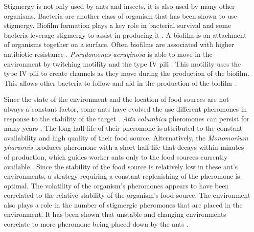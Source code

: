 Stigmergy is not only used by ants and insects, it is also used by many other organisms.
Bacteria are another class of organism that has been shown to use stigmergy.
Biofilm formation plays a key role in bacterial survival and some bacteria leverage stigmergy to assist in producing it \cite{gloag_bacterial_2015}.
A biofilm is an attachment of organisms together on a surface.
Often biofilms are associated with higher antibiotic resistance \cite{donlan2002biofilms}.
\textit{Pseudomonas aeruginosa} is able to move in the environment by twitching motility and the type IV pili \cite{persat2015type}.
This motility uses the type IV pili to create channels as they move during the production of the biofilm.
This allows other bacteria to follow and aid in the production of the biofilm \cite{gloag_stigmergy:_2013}.

Since the state of the environment and the location of food sources are not always a constant factor, some ants have evolved the use different pheromones in response to the stability of the target \cite{jeanson_pheromone_2003}.
\textit{Atta columbica} pheromones can persist for many years \cite{howard_costs_2001}.
The long half-life of their pheromone is attributed to the constant availability and high quality of their food source.
Alternatively, the \textit{Monomorium pharaonis} produces pheromone with a short half-life that decays within minutes of production, which guides worker ants only to the food sources currently available \cite{robinson_decay_2008}.
Since the stability of the food source is relatively low in these ant's environments, a strategy requiring a constant replenishing of the pheromone is optimal.
The volatility of the organism's pheromones appears to have been correlated to the relative stability of the organism's food source.
The environment also plays a role in the number of stigmergic pheromones that are placed in the environment.
It has been shown that unstable and changing environments correlate to more pheromone being placed down by the ants \cite{czaczkes2015trail}.

